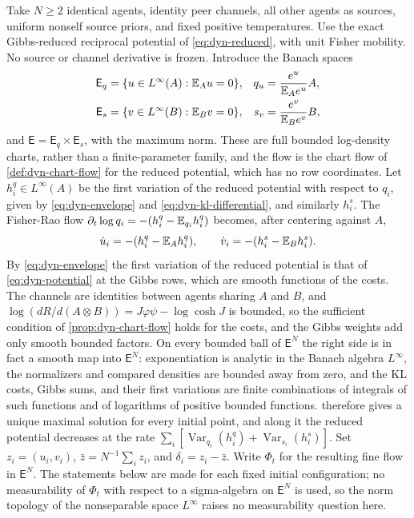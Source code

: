 Take $N\ge2$ identical agents, identity peer channels, all other agents as sources, uniform nonself source priors, and fixed positive temperatures. Use the exact Gibbs-reduced reciprocal potential of \cref{eq:dyn-reduced}, with unit Fisher mobility. No source or channel derivative is frozen. Introduce the Banach spaces
\begin{equation}
 \begin{aligned}
 \mathsf E_q&=\{u\in L^\infty(A):\mathbb E_Au=0\},&
 q_u&=\frac{e^u}{\mathbb E_Ae^u}A,\\
 \mathsf E_s&=\{v\in L^\infty(B):\mathbb E_Bv=0\},&
 s_v&=\frac{e^v}{\mathbb E_Be^v}B,
 \end{aligned}
 \label{eq:public-phase-chart}
\end{equation}
and $\mathsf E=\mathsf E_q\times\mathsf E_s$, with the maximum norm. These are full bounded log-density charts, rather than a finite-parameter family, and the flow is the chart flow of \cref{def:dyn-chart-flow} for the reduced potential, which has no row coordinates. Let $h_i^q\in L^\infty(A)$ be the first variation of the reduced potential with respect to $q_i$, given by \cref{eq:dyn-envelope} and \cref{eq:dyn-kl-differential}, and similarly $h_i^s$. The Fisher-Rao flow $\partial_t\log q_i=-(h_i^q-\mathbb E_{q_i}h_i^q)$ becomes, after centering against $A$,
\begin{equation}
 \dot u_i=-(h_i^q-\mathbb E_Ah_i^q),\qquad
 \dot v_i=-(h_i^s-\mathbb E_Bh_i^s).
 \label{eq:public-phase-chart-flow}
\end{equation}
By \cref{eq:dyn-envelope} the first variation of the reduced potential is that of \cref{eq:dyn-potential} at the Gibbs rows, which are smooth functions of the costs. The channels are identities between agents sharing $A$ and $B$, and $\log(dR/d(A\otimes B))=J\varphi\psi-\log\cosh J$ is bounded, so the sufficient condition of \cref{prop:dyn-chart-flow} holds for the costs, and the Gibbs weights add only smooth bounded factors. On every bounded ball of $\mathsf E^N$ the right side is in fact a smooth map into $\mathsf E^N$: exponentiation is analytic in the Banach algebra $L^\infty$, the normalizers and compared densities are bounded away from zero, and the KL costs, Gibbs sums, and their first variations are finite combinations of integrals of such functions and of logarithms of positive bounded functions.  therefore gives a unique maximal solution for every initial point, and along it the reduced potential decreases at the rate $\sum_i[\operatorname{Var}_{q_i}(h_i^q)+\operatorname{Var}_{s_i}(h_i^s)]$. Set $z_i=(u_i,v_i)$, $\bar z=N^{-1}\sum_i z_i$, and $\delta_i=z_i-\bar z$. Write $\Phi_t$ for the resulting fine flow in $\mathsf E^N$. The statements below are made for each fixed initial configuration; no measurability of $\Phi_t$ with respect to a sigma-algebra on $\mathsf E^N$ is used, so the norm topology of the nonseparable space $L^\infty$ raises no measurability question here.

